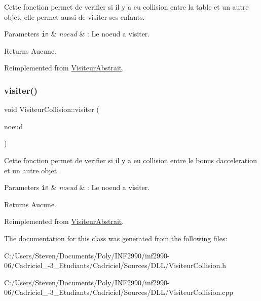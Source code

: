 Cette fonction permet de verifier si il y a eu collision entre la table et un autre objet, elle permet aussi de visiter ses enfants.


\begin{DoxyParams}[1]{Parameters}
\mbox{\tt in}  & {\em noeud} & \+: Le noeud a visiter.\\
\hline
\end{DoxyParams}
\begin{DoxyReturn}{Returns}
Aucune. 
\end{DoxyReturn}


Reimplemented from \hyperlink{class_visiteur_abstrait}{Visiteur\+Abstrait}.

\hypertarget{class_visiteur_collision_a9e56b43c1b38d5d4d08283d28b9dbcf2}{}\label{class_visiteur_collision_a9e56b43c1b38d5d4d08283d28b9dbcf2} 
\subsubsection{\texorpdfstring{visiter()}{visiter()}\hspace{0.1cm}{\footnotesize\ttfamily [8/8]}}
{\footnotesize\ttfamily void Visiteur\+Collision\+::visiter (\begin{DoxyParamCaption}\item[{\hyperlink{class_noeud_bonus_accelerateur}{Noeud\+Bonus\+Accelerateur} $\ast$}]{noeud }\end{DoxyParamCaption})\hspace{0.3cm}{\ttfamily [virtual]}}

Cette fonction permet de verifier si il y a eu collision entre le bonus d\textquotesingle{}acceleration et un autre objet.


\begin{DoxyParams}[1]{Parameters}
\mbox{\tt in}  & {\em noeud} & \+: Le noeud a visiter.\\
\hline
\end{DoxyParams}
\begin{DoxyReturn}{Returns}
Aucune. 
\end{DoxyReturn}


Reimplemented from \hyperlink{class_visiteur_abstrait}{Visiteur\+Abstrait}.



The documentation for this class was generated from the following files\+:\begin{DoxyCompactItemize}
\item 
C\+:/\+Users/\+Steven/\+Documents/\+Poly/\+I\+N\+F2990/inf2990-\/06/\+Cadriciel\+\_-\/3\+\_\+\+Etudiants/\+Cadriciel/\+Sources/\+D\+L\+L/Visiteur\+Collision.\+h\item 
C\+:/\+Users/\+Steven/\+Documents/\+Poly/\+I\+N\+F2990/inf2990-\/06/\+Cadriciel\+\_-\/3\+\_\+\+Etudiants/\+Cadriciel/\+Sources/\+D\+L\+L/Visiteur\+Collision.\+cpp\end{DoxyCompactItemize}
